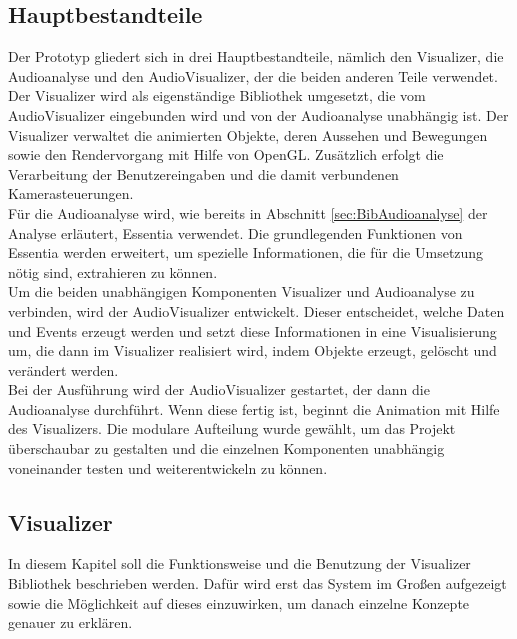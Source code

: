 \documentclass[11pt,a4paper]{article}
\begin{document}
\subsection{Hauptbestandteile}
Der Prototyp gliedert sich in drei Hauptbestandteile, nämlich den Visualizer, die Audioanalyse und den AudioVisualizer, der die beiden anderen Teile verwendet. Der Visualizer wird als eigenständige Bibliothek umgesetzt, die vom AudioVisualizer eingebunden wird und von der Audioanalyse unabhängig ist. Der Visualizer verwaltet die animierten Objekte, deren Aussehen und Bewegungen sowie den Rendervorgang mit Hilfe von OpenGL. Zusätzlich erfolgt die Verarbeitung der Benutzereingaben und die damit verbundenen Kamerasteuerungen.\\
Für die Audioanalyse wird, wie bereits in Abschnitt \ref{sec:BibAudioanalyse} der Analyse erläutert, Essentia verwendet. Die grundlegenden Funktionen von Essentia werden erweitert, um spezielle Informationen, die für die Umsetzung nötig sind, extrahieren zu können.\\
Um die beiden unabhängigen Komponenten Visualizer und Audioanalyse zu verbinden, wird der AudioVisualizer entwickelt. Dieser entscheidet, welche Daten und Events erzeugt werden und setzt diese Informationen in eine Visualisierung um, die dann im Visualizer realisiert wird, indem Objekte erzeugt, gelöscht und verändert werden.\\
Bei der Ausführung wird der AudioVisualizer gestartet, der dann die Audioanalyse durchführt. Wenn diese fertig ist, beginnt die Animation mit Hilfe des Visualizers. Die modulare Aufteilung wurde gewählt, um das Projekt überschaubar zu gestalten und die einzelnen Komponenten unabhängig voneinander testen und weiterentwickeln zu können.

\subsection{Visualizer}
In diesem Kapitel soll die Funktionsweise und die Benutzung der Visualizer Bibliothek beschrieben werden. Dafür wird erst das System im Großen aufgezeigt sowie die Möglichkeit auf dieses einzuwirken, um danach einzelne Konzepte genauer zu erklären.
\end{document}
